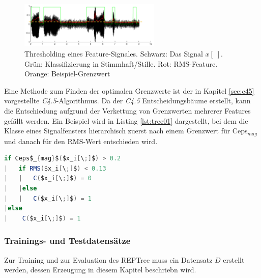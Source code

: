 \begin{figure}[h]
	\centering
	\includegraphics[width=0.6\textwidth]{bilder/thresholded02.png}
	\caption{Thresholding eines Feature-Signales. Schwarz: Das Signal $x[\;]$. Grün: Klassifizierung in Stimmhaft/Stille. Rot: RMS-Feature. Orange: Beispiel-Grenzwert}
	\label{img:thresholded}
\end{figure}

Eine Methode zum Finden der optimalen Grenzwerte ist der in Kapitel \ref{sec:c45} vorgestellte \emph{C4.5}-Algorithmus. Da der \emph{C4.5} Entscheidungsbäume erstellt, kann die Entschiedung aufgrund der Verkettung von Grenzwerten mehrerer Features gefällt werden. Ein Beispiel wird in Listing \ref{lst:tree01} dargestellt, bei dem die Klasse eines  Signalfensters hierarchisch zuerst nach einem Grenzwert für Ceps$_{mag}$ und danach für den RMS-Wert entschieden wird.

\begin{lstlisting}[frame=single,mathescape=true,basicstyle=\footnotesize,language=Java,label=lst:tree01,caption=Beispiel eines CART-Entscheidungsbaums,linewidth=1\textwidth]
if Ceps$_{mag}$($x_i[\;]$) > 0.2
|   if RMS($x_i[\;]$) < 0.13
|   |   C($x_i[\;]$) = 0
|   |else
|   |   C($x_i[\;]$) = 1
|else
|    C($x_i[\;]$) = 1
\end{lstlisting}

\subsubsection{Trainings- und Testdatensätze}
\label{sec:databases}

Zur Training und zur Evaluation des REPTree muss ein Datensatz $D$ erstellt werden, dessen Erzeugung in diesem Kapitel beschriebn wird. 

